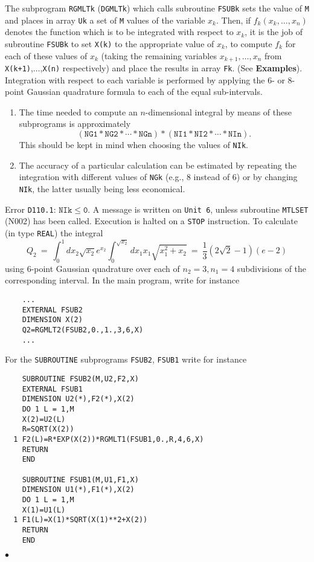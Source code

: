 The subprogram {\tt RGMLTk} ({\tt DGMLTk}) which calls subroutine
{\tt FSUBk}
sets the value of {\tt M} and places in array {\tt Uk} a set of {\tt M}
values of the variable $x_k$. Then, if $f_k(x_k,\ldots,x_n)$ denotes
the function which is to be integrated with respect to $x_k$, it is the
job of subroutine {\tt FSUBk} to set {\tt X(k)} to the appropriate
value of $x_k$, to compute $f_k$ for each of these values of $x_k$
(taking the remaining variables $x_{k+1},\ldots,x_n$ from
{\tt X(k+1)},$\ldots$,{\tt X(n)} respectively) and place the results in
array {\tt Fk}. (See {\bf Examples}).
\Method
Integration with respect to each variable is performed by applying the
6- or 8-point Gaussian quadrature formula to each of the equal
sub-intervals.
\Notes
\begin{enumerate}
\item The time needed to compute an $n$-dimensional integral by means
of these subprograms is approximately
$$\mathtt{(NG1*NG2*\cdots*NGn)*(NI1*NI2*\cdots*NIn)}.$$
This should be kept in mind when choosing the values of {\tt NIk}.
\item The accuracy of a particular calculation can be estimated by
repeating the integration with different values of {\tt NGk} (e.g.,
8 instead of 6) or by changing {\tt NIk}, the latter usually being less
economical.
\end{enumerate}
\Errorh
Error {\tt D110.1}: $\mathtt{NIk \le 0}$. A message is written on
{\tt Unit 6}, unless subroutine {\tt MTLSET} (N002) has been called.
Execution is halted on a {\tt STOP} instruction.
\Examples
To calculate (in type {\tt REAL}) the integral
$$ Q_2 \ = \
\displaystyle \int_0^1 dx_2 \sqrt{x_2} e^{x_2}
\displaystyle \int_0^{\sqrt{x_2}} dx_1 x_1 \sqrt{x_1^2+x_2} \ = \
\frac{1}{3} (2\sqrt{2}-1)(e-2)$$
using 6-point Gaussian quadrature over each of $n_2 = 3, n_1 = 4$
subdivisions of the corresponding interval.
In the main program, write for instance
\newpage
\begin{verbatim}
    ...
    EXTERNAL FSUB2
    DIMENSION X(2)
    Q2=RGMLT2(FSUB2,0.,1.,3,6,X)
    ...
\end{verbatim}
For the {\tt SUBROUTINE} subprograms {\tt FSUB2}, {\tt FSUB1} write
for instance
\begin{verbatim}
    SUBROUTINE FSUB2(M,U2,F2,X)
    EXTERNAL FSUB1
    DIMENSION U2(*),F2(*),X(2)
    DO 1 L = 1,M
    X(2)=U2(L)
    R=SQRT(X(2))
  1 F2(L)=R*EXP(X(2))*RGMLT1(FSUB1,0.,R,4,6,X)
    RETURN
    END

    SUBROUTINE FSUB1(M,U1,F1,X)
    DIMENSION U1(*),F1(*),X(2)
    DO 1 L = 1,M
    X(1)=U1(L)
  1 F1(L)=X(1)*SQRT(X(1)**2+X(2))
    RETURN
    END
\end{verbatim}
$\bullet$
